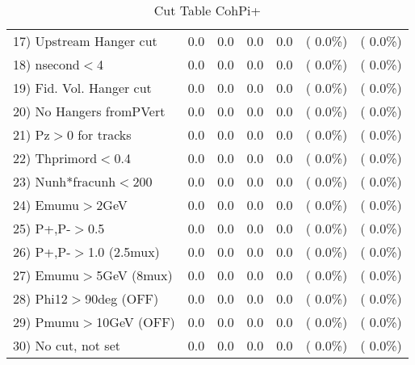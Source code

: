 \begin{table}[h!]
\begin{tabular}{||l||r|r|r|r|r|r||}
 17) Upstream Hanger cut  &          0.0 &          0.0 &          0.0 &          0.0 & (  0.0\%) & (  0.0\%) \\
 18) nsecond$<$4          &          0.0 &          0.0 &          0.0 &          0.0 & (  0.0\%) & (  0.0\%) \\
 19) Fid. Vol. Hanger cut &          0.0 &          0.0 &          0.0 &          0.0 & (  0.0\%) & (  0.0\%) \\
 20) No Hangers fromPVert &          0.0 &          0.0 &          0.0 &          0.0 & (  0.0\%) & (  0.0\%) \\
 21) Pz$>$0 for tracks    &          0.0 &          0.0 &          0.0 &          0.0 & (  0.0\%) & (  0.0\%) \\
 22) Thprimord$<$0.4      &          0.0 &          0.0 &          0.0 &          0.0 & (  0.0\%) & (  0.0\%) \\
 23) Nunh*fracunh$<$200   &          0.0 &          0.0 &          0.0 &          0.0 & (  0.0\%) & (  0.0\%) \\
 24) Emumu$>$2GeV         &          0.0 &          0.0 &          0.0 &          0.0 & (  0.0\%) & (  0.0\%) \\
 25) P+,P-$>$0.5          &          0.0 &          0.0 &          0.0 &          0.0 & (  0.0\%) & (  0.0\%) \\
 26) P+,P-$>$1.0 (2.5mux) &          0.0 &          0.0 &          0.0 &          0.0 & (  0.0\%) & (  0.0\%) \\
 27) Emumu$>$5GeV  (8mux) &          0.0 &          0.0 &          0.0 &          0.0 & (  0.0\%) & (  0.0\%) \\
 28) Phi12$>$90deg  (OFF) &          0.0 &          0.0 &          0.0 &          0.0 & (  0.0\%) & (  0.0\%) \\
 29) Pmumu$>$10GeV  (OFF) &          0.0 &          0.0 &          0.0 &          0.0 & (  0.0\%) & (  0.0\%) \\
 30) No cut, not set      &          0.0 &          0.0 &          0.0 &          0.0 & (  0.0\%) & (  0.0\%) \\
 \hline
 \hline
 \end{tabular}
 \caption{Cut Table  CohPi+   }
 \label{tab-cutcohjpsi-mumu_nuecc}
 \end{table}
